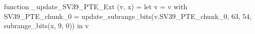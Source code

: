 function _update_SV39_PTE_Ext (v, x) = let v = { v with SV39_PTE_chunk_0 = update_subrange_bits(v.SV39_PTE_chunk_0, 63, 54, subrange_bits(x, 9, 0)) } in
  v
